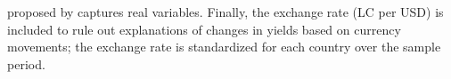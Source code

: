{proposed by \cite{Hamilton:2019} captures real variables. %
Finally, the exchange rate (LC per USD) is included to rule out explanations of changes in yields based on currency movements; the exchange rate is standardized for each country over the sample period.

}
